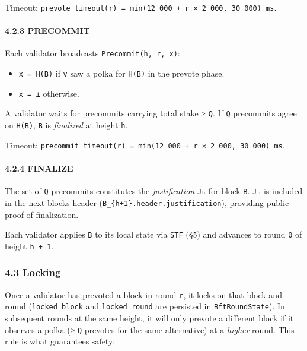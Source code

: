 \documentclass[11pt,a4paper]{article}
\providecommand{\tightlist}{\setlength{\itemsep}{0pt}\setlength{\parskip}{0pt}}
\begin{document}
Timeout:
\texttt{prevote\_timeout(r)\ =\ min(12\_000\ +\ r\ ×\ 2\_000,\ 30\_000)\ ms}.

\hypertarget{423-precommit}{%
\paragraph{4.2.3 PRECOMMIT}\label{423-precommit}}

Each validator broadcasts \texttt{Precommit(h,\ r,\ x)}:

\begin{itemize}
\tightlist
\item
  \texttt{x\ =\ H(B)} if \texttt{v} saw a polka for \texttt{H(B)} in the
  prevote phase.
\item
  \texttt{x\ =\ ⊥} otherwise.
\end{itemize}

A validator waits for precommits carrying total stake ≥ \texttt{Q}. If
\texttt{Q} precommits agree on \texttt{H(B)}, \texttt{B} is
\emph{finalized} at height \texttt{h}.

Timeout:
\texttt{precommit\_timeout(r)\ =\ min(12\_000\ +\ r\ ×\ 2\_000,\ 30\_000)\ ms}.

\hypertarget{424-finalize}{%
\paragraph{4.2.4 FINALIZE}\label{424-finalize}}

The set of \texttt{Q} precommits constitutes the \emph{justification}
\texttt{Jₕ} for block \texttt{B}. \texttt{Jₕ} is included in the next
block\textquotesingle s header
(\texttt{B\_\{h+1\}.header.justification}), providing public proof of
finalization.

Each validator applies \texttt{B} to its local state via \texttt{STF}
(§5) and advances to round \texttt{0} of height \texttt{h\ +\ 1}.

\hypertarget{43-locking}{%
\subsubsection{4.3 Locking}\label{43-locking}}

Once a validator has prevoted a block in round \texttt{r}, it locks on
that block and round (\texttt{locked\_block} and \texttt{locked\_round}
are persisted in \texttt{BftRoundState}). In subsequent rounds at the
same height, it will only prevote a different block if it observes a
polka (≥ \texttt{Q} prevotes for the same alternative) at a
\emph{higher} round. This rule is what guarantees safety:
\end{document}
